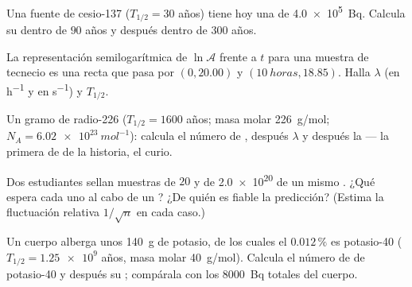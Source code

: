 \begin{exercise}[$\star$]\label{exo:g12:radioactive-decay:4}
Una fuente de cesio-137 ($T_{1/2} = 30$ años) tiene hoy una  de
\qty{4.0e5}{Bq}. Calcula su  dentro de $90$ años y después dentro de $300$
años.
\end{exercise}

\begin{exercise}[$\star$]\label{exo:g12:radioactive-decay:5}
La representación semilogarítmica de $\ln \mathcal A$ frente a $t$ para una muestra de
tecnecio es una recta que pasa por $(0, 20.00)$ y $(\qty{10}{horas}, 18.85)$. Halla
$\lambda$ (en \unit{h^{-1}} y en \unit{s^{-1}}) y $T_{1/2}$.
\end{exercise}

\begin{exercise}[$\star\star$]\label{exo:g12:radioactive-decay:6}
Un gramo de radio-226 ($T_{1/2} = 1600$ años; masa molar \qty{226}{g/mol};
$N_A = \qty{6.02e23}{mol^{-1}}$): calcula el número de , después $\lambda$ y
después la  --- la primera  de  de la historia, el curio.
\end{exercise}

\begin{exercise}[$\star\star$]\label{exo:g12:radioactive-decay:7}
Dos estudiantes sellan muestras de $20$ y de \num{2.0e20}  de un mismo
. ¿Qué espera cada uno al cabo de un ? ¿De quién
es fiable la predicción? (Estima la fluctuación relativa $1/\sqrt n$ en cada caso.)
\end{exercise}

\begin{exercise}[$\star\star$]\label{exo:g12:radioactive-decay:8}
Un cuerpo alberga unos \qty{140}{g} de potasio, de los cuales el $0.012\,\%$ es
potasio-40 ($T_{1/2} = \num{1.25e9}$ años, masa molar \qty{40}{g/mol}). Calcula el
número de  de potasio-40 y después su ; compárala con los
\qty{8000}{Bq} totales del cuerpo.
\end{exercise}

